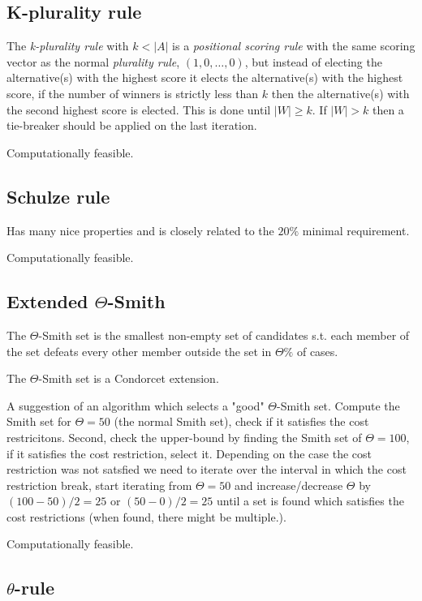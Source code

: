 \documentclass{article}
\begin{document}
\subsection{K-plurality rule}

The {\em k-plurality rule} with $k<|A|$ is a {\em positional scoring rule} with the same scoring vector as the normal
{\em plurality rule}, $(1,0, \dots, 0)$, but instead of electing the alternative(s) with the highest score it elects the
alternative(s) with the highest score, if the number of winners is strictly less than $k$ then the alternative(s) with
the second highest score is elected. This is done until $|W| \geq k$. If $|W| > k$ then a tie-breaker should be applied
on the last iteration.


Computationally feasible.\subsection{Schulze rule}

Has many nice properties and is closely related to the $20\%$ minimal requirement.

Computationally feasible.


\subsection{Extended $\Theta$-Smith}

The $\Theta$-Smith set is the smallest non-empty set of candidates s.t. each member of the set defeats every other member outside
 the set in $\Theta \%$ of cases.

 The $\Theta$-Smith set is a Condorcet extension.

A suggestion of an algorithm which selects a "good" $\Theta$-Smith set. Compute the Smith set for $\Theta=50$
(the normal Smith set), check if it satisfies the cost restricitons. Second, check the upper-bound by finding the Smith
set of $\Theta=100$, if it satisfies the cost restriction, select it. Depending on the case the cost restriction was not
satsfied we need to iterate over the interval in which the cost restriction break, start iterating from $\Theta=50$ and
 increase/decrease $\Theta$ by $(100-50)/2=25$ or $(50-0)/2=25$ until a set is found which satisfies the cost
 restrictions (when found, there might be multiple.).

Computationally feasible.

\subsection{$\theta$-rule}
\end{document}
